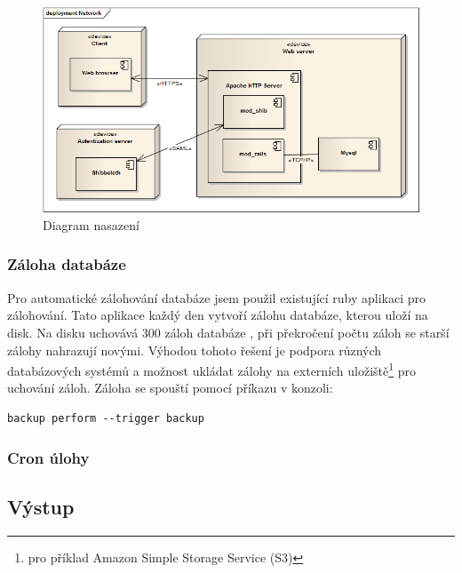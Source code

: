 

\begin{figure}[h]
\begin{center}
\includegraphics[width=12cm]{figures/deployment}
\caption{Diagram nasazení}
\label{fig:deployment}
\end{center}
\end{figure}

\subsubsection{Záloha databáze}
Pro automatické zálohování databáze jsem použil existující ruby aplikaci pro zálohování. Tato aplikace každý den vytvoří zálohu databáze, kterou uloží na disk. Na disku uchovává 300 záloh databáze , při překročení počtu záloh se starší zálohy nahrazují novými. Výhodou tohoto řešení je podpora různých databázových systémů a možnost ukládat zálohy na externích uložiště\footnote{pro příklad Amazon Simple Storage Service (S3)} pro uchování záloh. Záloha se spouští pomocí příkazu v konzoli:
\begin{verbatim}
backup perform --trigger backup
\end{verbatim} 

\subsubsection{Cron úlohy}


\subsection{Výstup} 

